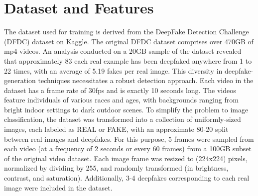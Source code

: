 \section{Dataset and Features}
The dataset used for training is derived from the DeepFake Detection Challenge
(DFDC) dataset on Kaggle. The original DFDC dataset comprises over 470GB of mp4
videos. An analysis conducted on a 20GB sample of the dataset revealed that
approximately 83%
each real example has been deepfaked anywhere from 1 to 22 times, with an average
of 5.19 fakes per real image. This diversity in deepfake-generation techniques
necessitates a robust detection approach.
Each video in the dataset has a frame rate of 30fps and is exactly 10 seconds long.
The videos feature individuals of various races and ages, with backgrounds ranging
from bright indoor settings to dark outdoor scenes. To simplify the problem to image
classification, the dataset was transformed into a collection of uniformly-sized
images, each labeled as REAL or FAKE, with an approximate 80-20 split between real
images and deepfakes.
For this purpose, 5 frames were sampled from each video (at a frequency of 2
seconds or every 60 frames) from a 100GB subset of the original video dataset. Each
image frame was resized to (224x224) pixels, normalized by dividing by 255, and
randomly transformed (in brightness, contrast, and saturation). Additionally, 3-4
deepfakes corresponding to each real image were included in the dataset.